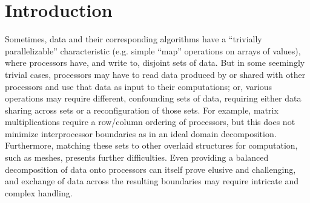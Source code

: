 \chapter{Introduction}
Sometimes, data and their corresponding algorithms have a ``trivially
parallelizable'' characteristic (e.g. simple ``map'' operations on arrays of
values), where processors have, and write to, disjoint sets of data. But in
some seemingly trivial cases, processors may have to read data produced by or
shared with other processors and use that data as input to their computations;
or, various operations may require different, confounding sets of data,
requiring either data sharing across sets or a reconfiguration of those sets.
For example, matrix multiplications require a row/column ordering of processors,
but this does not minimize interprocessor boundaries as in an ideal domain
decomposition. Furthermore, matching these sets to other overlaid structures for
computation, such as meshes, presents further difficulties. Even providing a
balanced decomposition of data onto processors can itself prove elusive and
challenging, and exchange of data across the resulting boundaries may require
intricate and complex handling.


